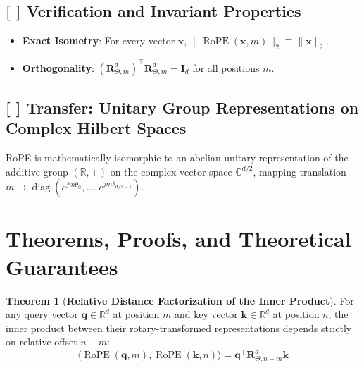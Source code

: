 \documentclass[11pt,a4paper]{article}
\theoremstyle{definition}
\newtheorem{theorem}{\textbf{Theorem}}[section]
\begin{document}
\subsection{[ ] Verification and Invariant Properties}
\begin{itemize}
    \item \textbf{Exact Isometry}: For every vector $\mathbf{x}$, $\|\operatorname{RoPE}(\mathbf{x}, m)\|_2 \equiv \|\mathbf{x}\|_2$.
    \item \textbf{Orthogonality}: $(\mathbf{R}_{\Theta, m}^d)^\top \mathbf{R}_{\Theta, m}^d = \mathbf{I}_d$ for all positions $m$.
\end{itemize}

\subsection{[ ] Transfer: Unitary Group Representations on Complex Hilbert Spaces}
RoPE is mathematically isomorphic to an abelian unitary representation of the additive group $(\mathbb{R}, +)$ on the complex vector space $\mathbb{C}^{d/2}$, mapping translation $m \mapsto \operatorname{diag}(e^{j m \theta_0}, \dots, e^{j m \theta_{d/2-1}})$.

\section{Theorems, Proofs, and Theoretical Guarantees}

\begin{theorem}[\textbf{Relative Distance Factorization of the Inner Product}]
For any query vector $\mathbf{q} \in \mathbb{R}^d$ at position $m$ and key vector $\mathbf{k} \in \mathbb{R}^d$ at position $n$, the inner product between their rotary-transformed representations depends strictly on relative offset $n - m$:
{\boldmath
\begin{equation}
\langle \operatorname{RoPE}(\mathbf{q}, m), \operatorname{RoPE}(\mathbf{k}, n) \rangle = \mathbf{q}^\top \mathbf{R}_{\Theta, n - m}^d \mathbf{k}
\end{equation}
}
\end{theorem}
\end{document}
